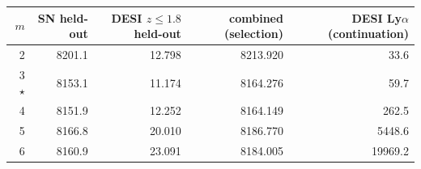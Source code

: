 \begin{tabular}{rrrrr}
\toprule
$m$ & SN held-out & DESI $z\le1.8$ held-out & combined (selection) & DESI Ly$\alpha$ (continuation) \\
\midrule
2 & 8201.1 & 12.798 & 8213.920 & 33.6 \\
3 $\star$ & 8153.1 & 11.174 & 8164.276 & 59.7 \\
4 & 8151.9 & 12.252 & 8164.149 & 262.5 \\
5 & 8166.8 & 20.010 & 8186.770 & 5448.6 \\
6 & 8160.9 & 23.091 & 8184.005 & 19969.2 \\
\bottomrule
\end{tabular}
